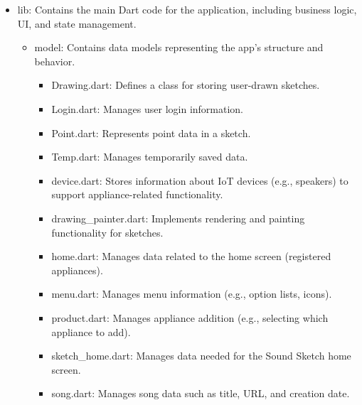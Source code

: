 \documentclass[conference]{IEEEtran}
\begin{document}
\begin{itemize}
    \item lib: Contains the main Dart code for the application, including business logic, UI, and state management.
    \begin{itemize}
\item model: Contains data models representing the app's structure and behavior.
\begin{itemize}
    \item Drawing.dart: Defines a class for storing user-drawn sketches. \\
    \item Login.dart: Manages user login information. \\
    \item Point.dart: Represents point data in a sketch. \\
    \item Temp.dart: Manages temporarily saved data. \\
    \item device.dart: Stores information about IoT devices (e.g., speakers) to support appliance-related functionality. \\
    \item drawing\_painter.dart: Implements rendering and painting functionality for sketches. \\
    \item home.dart: Manages data related to the home screen (registered appliances). \\
    \item menu.dart: Manages menu information (e.g., option lists, icons). \\
    \item product.dart: Manages appliance addition (e.g., selecting which appliance to add). \\
    \item sketch\_home.dart: Manages data needed for the Sound Sketch home screen. \\
    \item song.dart: Manages song data such as title, URL, and creation date. \\
\end{itemize}


\end{itemize}
\end{itemize}
\end{document}
